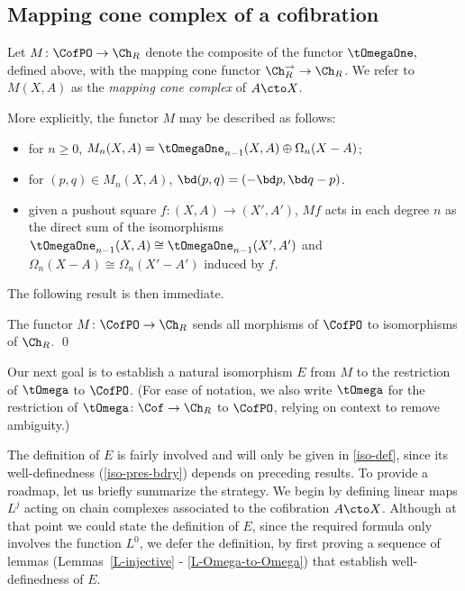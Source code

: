 \subsection{Mapping cone complex of a cofibration}

\begin{defi}\label{def:M}
Let $M \colon \CofPO \to \Ch_R$ denote the composite of the functor $\tOmegaOne,$ defined above, with the mapping cone functor $\Ch^{\rightarrow}_R \to \Ch_R$. 
We refer to $M(X, A)$ as the \emph{mapping cone complex} of $A \cto X$.
\end{defi}

More explicitly, the functor $M$ may be described as follows:
\begin{itemize}
    \item for $n \geq 0$, $M_n(X,A) = \tOmegaOne_{n-1}(X,A) \oplus \Omega_n(X-A)$;
    \item for $(p,q) \in M_n(X,A)$, $\bd(p,q) = (-\bd p, \bd q - p)$.
    \item given a pushout square $f \colon (X,A) \to (X',A')$, $Mf$ acts in each degree $n$ as the direct sum of the isomorphisms $\tOmegaOne_{n-1}(X,A) \cong \tOmegaOne_{n-1}(X',A')$ and $\Omega_n(X-A) \cong \Omega_n(X' - A')$ induced by $f$.
\end{itemize}

The following result is then immediate.

\begin{lemma}\label{mapping-cone-invariant}
The functor $M \colon \CofPO \to \Ch_R$ sends all morphisms of $\CofPO$ to isomorphisms of $\Ch_R$. \qed
\end{lemma}

Our next goal is to establish a natural isomorphism $E$ from $M$ to the restriction of $\tOmega$ to $\CofPO$.
(For ease of notation, we also write $\tOmega$ for the restriction of $\tOmega \colon \Cof \to \Ch_R$ to $\CofPO$, relying on context to remove ambiguity.) 

The definition of $E$ is fairly involved and will only be given in \cref{iso-def}, since its well-definedness (\cref{iso-pres-bdry}) depends on preceding results.
To provide a roadmap, let us briefly summarize the strategy.
We begin by defining linear maps $L^j$ acting on chain complexes associated to the cofibration $A \cto X$.
Although at that point we could state the definition of $E$, since the required formula only involves the function $L^0$, we defer the definition, by first proving a sequence of lemmas (Lemmas~\ref{L-injective} - \ref{L-Omega-to-Omega}) that establish well-definedness of $E.$

